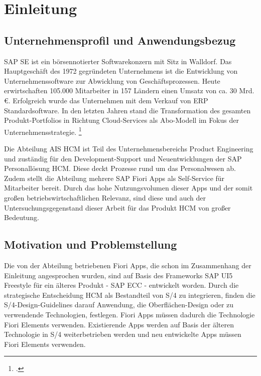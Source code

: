 \chapter{Einleitung}

\section{Unternehmensprofil und Anwendungsbezug}

SAP SE ist ein börsennotierter Softwarekonzern mit Sitz in Walldorf. Das Hauptgeschäft des 1972 gegründeten Unternehmens ist die Entwicklung von Unternehmenssoftware zur Abwicklung von Geschäftsprozessen. Heute erwirtschaften 105.000 Mitarbeiter in 157 Ländern einen Umsatz von ca. 30 Mrd. \euro{}. Erfolgreich wurde das Unternehmen mit dem Verkauf von ERP Standardsoftware. In den letzten Jahren stand die Transformation des gesamten Produkt-Portfolios in Richtung Cloud-Services als Abo-Modell im Fokus der Unternehmensstrategie. \footcite[Vgl.][]{sap_geschichte_2023}

Die Abteilung AIS HCM ist Teil des Unternehmensbereichs Product Engineering und zuständig für den Development-Support und Neuentwicklungen der SAP Personallösung HCM. Diese deckt Prozesse rund um das Personalwesen ab. Zudem stellt die Abteilung mehrere SAP Fiori Apps als Self-Service für Mitarbeiter bereit. Durch das hohe Nutzungsvolumen dieser Apps und der somit gro{\ss}en betriebswirtschaftlichen Relevanz, sind diese und auch der Untersuchungsgegenstand dieser Arbeit für das Produkt HCM von gro{\ss}er Bedeutung.


\section{Motivation und Problemstellung}

Die von der Abteilung betriebenen Fiori Apps, die schon im Zusammenhang der Einleitung angesprochen wurden, sind auf Basis des Frameworks SAP UI5 Freestyle für ein älteres Produkt - SAP ECC - entwickelt worden. Durch die strategische Entscheidung HCM als Bestandteil von S/4 zu integrieren, finden die S/4-Design-Guidelines darauf Anwendung, die \zB Oberflächen-Design oder zu verwendende Technologien, festlegen. Fiori Apps müssen dadurch die Technologie Fiori Elements verwenden. Existierende Apps werden auf Basis der älteren Technologie in S/4 weiterbetrieben werden und neu entwickelte Apps müssen Fiori Elements verwenden.

